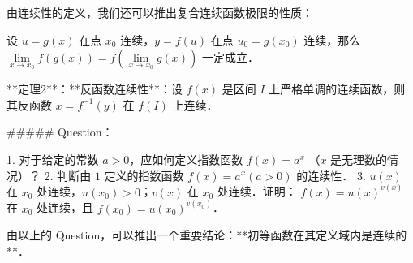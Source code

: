   由连续性的定义，我们还可以推出复合连续函数极限的性质：

  设 $u=g(x)$ 在点 $x_0$ 连续，$y=f(u)$ 在点 $u_0=g(x_0)$ 连续，那么$\lim\limits_{x\rightarrow x_0}f(g(x))=f(\lim\limits_{x\rightarrow x_0}g(x))$ 一定成立．

  **定理2**：**反函数连续性**：设 $f(x)$ 是区间 $I$ 上严格单调的连续函数，则其反函数 $x=f^{-1}(y)$ 在 $f(I)$ 上连续．

  ##### Question：

  1. 对于给定的常数 $a>0$，应如何定义指数函数 $f(x)=a^x$ （$x$ 是无理数的情况）？
  2. 判断由 $1$ 定义的指数函数 $f(x)=a^x(a>0)$ 的连续性．
  3. $u(x)$ 在 $x_0$ 处连续，$u(x_0)>0$；$v(x)$ 在 $x_0$ 处连续．证明： $f(x)=u(x)^{v(x)}$ 在 $x_0$ 处连续，且 $f(x_0)=u(x_0)^{v(x_0)}$．

  由以上的 Question，可以推出一个重要结论：**初等函数在其定义域内是连续的**．